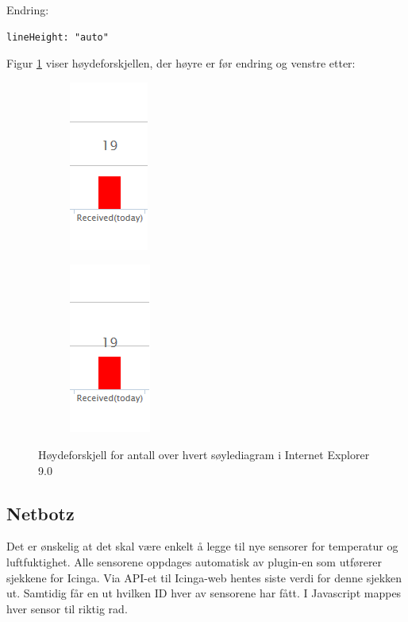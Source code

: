 Endring:

\begin{lstlisting}[style=example]
lineHeight: "auto"
\end{lstlisting}

Figur \ref{IE_bug} viser høydeforskjellen, der høyre er før endring og venstre etter:

\begin{figure}[H]
\centering
\begin{subfigure}
  \centering
  \includegraphics[scale=0.7]{img/IE_footprints_bug}
\end{subfigure}
\begin{subfigure}
  \centering
  \includegraphics[scale=0.7]{img/IE_footprints_fix}
\end{subfigure}
\caption{Høydeforskjell for antall over hvert søylediagram i Internet Explorer 9.0}
\label{IE_bug}
\end{figure}

\subsection{Netbotz}
Det er ønskelig at det skal være enkelt å legge til nye sensorer for temperatur og luftfuktighet. Alle sensorene oppdages automatisk av plugin-en som utførerer sjekkene for Icinga. Via API-et til Icinga-web hentes siste verdi for denne sjekken ut. Samtidig får en ut hvilken ID hver av sensorene har fått. I Javascript mappes hver sensor til riktig rad.

